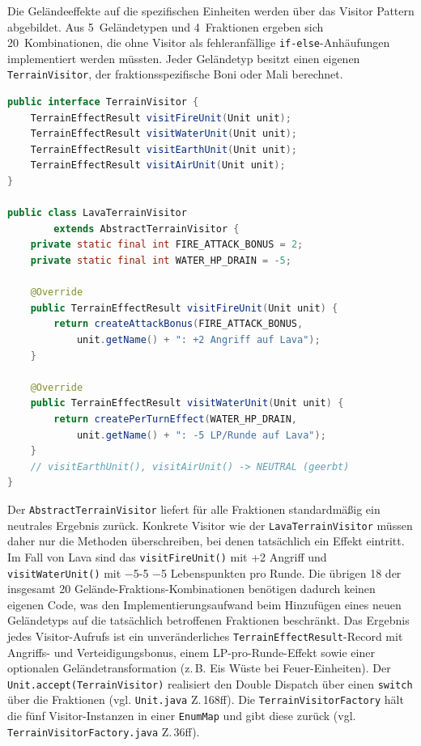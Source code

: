 Die Geländeeffekte auf die spezifischen Einheiten werden über das Visitor Pattern abgebildet.
Aus 5~Geländetypen und 4~Fraktionen ergeben sich 20~Kombinationen, die ohne Visitor als fehleranfällige \texttt{if-else}-Anhäufungen
implementiert werden müssten.
Jeder Geländetyp besitzt einen eigenen \texttt{TerrainVisitor}, der fraktionsspezifische Boni oder Mali berechnet.

\begin{lstlisting}[language=Java, caption={Visitor -- TerrainVisitor und LavaTerrainVisitor}, label={lst:visitor-lava}]
public interface TerrainVisitor {
    TerrainEffectResult visitFireUnit(Unit unit);
    TerrainEffectResult visitWaterUnit(Unit unit);
    TerrainEffectResult visitEarthUnit(Unit unit);
    TerrainEffectResult visitAirUnit(Unit unit);
}

public class LavaTerrainVisitor
        extends AbstractTerrainVisitor {
    private static final int FIRE_ATTACK_BONUS = 2;
    private static final int WATER_HP_DRAIN = -5;

    @Override
    public TerrainEffectResult visitFireUnit(Unit unit) {
        return createAttackBonus(FIRE_ATTACK_BONUS,
            unit.getName() + ": +2 Angriff auf Lava");
    }

    @Override
    public TerrainEffectResult visitWaterUnit(Unit unit) {
        return createPerTurnEffect(WATER_HP_DRAIN,
            unit.getName() + ": -5 LP/Runde auf Lava");
    }
    // visitEarthUnit(), visitAirUnit() -> NEUTRAL (geerbt)
}
\end{lstlisting}

Der \texttt{AbstractTerrainVisitor} liefert für alle Fraktionen standardmäßig ein neutrales Ergebnis zurück. Konkrete Visitor
wie der \texttt{LavaTerrainVisitor} müssen daher nur die Methoden überschreiben, bei denen tatsächlich ein Effekt eintritt.
Im Fall von Lava sind das \texttt{visitFireUnit()} mit +2 Angriff und \texttt{visitWaterUnit()} mit −5-5 −5 Lebenspunkten
pro Runde. Die übrigen 18 der insgesamt 20 Gelände-Fraktions-Kombinationen benötigen dadurch keinen eigenen Code, was den
Implementierungsaufwand beim Hinzufügen eines neuen Geländetyps auf die tatsächlich betroffenen Fraktionen beschränkt. Das
Ergebnis jedes Visitor-Aufrufs ist ein unveränderliches \texttt{TerrainEffectResult}-Record mit Angriffs- und Verteidigungsbonus,
einem LP-pro-Runde-Effekt sowie einer optionalen Geländetransformation (z.\,B. Eis \rightarrow Wüste bei Feuer-Einheiten).
Der \texttt{Unit.accept(TerrainVisitor)} realisiert den Double Dispatch über einen \texttt{switch}
über die Fraktionen (vgl. \texttt{Unit.java} Z.\,168ff). Die \texttt{TerrainVisitorFactory} hält die fünf Visitor-Instanzen
in einer \texttt{EnumMap} und gibt diese zurück (vgl. \texttt{TerrainVisitorFactory.java} Z.\,36ff).


